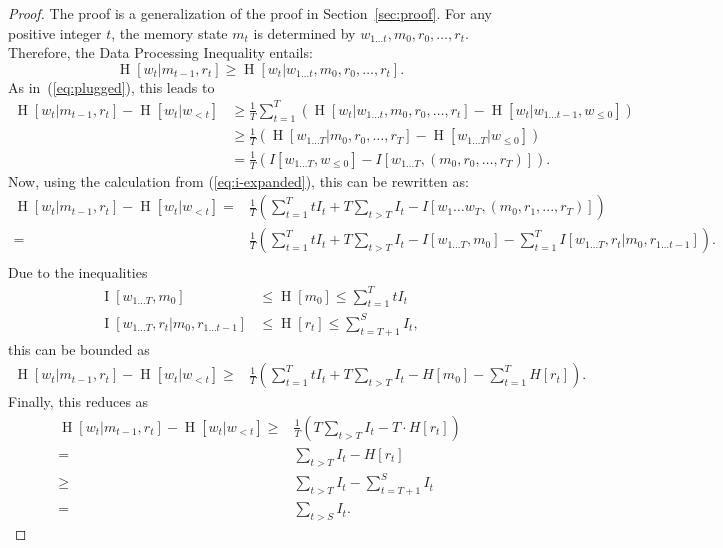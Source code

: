 \documentclass[11pt,letterpaper]{article}
\begin{document}
\begin{proof}
The proof is a generalization of the proof in Section~\ref{sec:proof}.
	For any positive integer $t$, the memory state $m_t$ is determined by $w_{1\dots t}, m_0, r_0, \dots, r_t$.
	Therefore, the Data Processing Inequality entails:
	\begin{equation}
		\operatorname{H}[w_t|m_{t-1}, r_t] \geq \operatorname{H}[w_t|w_{1\dots t}, m_0, r_0, \dots, r_t].
	\end{equation}
	As in~(\ref{eq:plugged}), this leads to
\begin{align}
\operatorname{H}[w_t | m_{t-1}, r_t] - \operatorname{H}[w_t | w_{<t}]& \geq \frac{1}{T} \sum_{t=1}^T ( \operatorname{H}[w_t|w_{1\dots t}, m_0, r_0, \dots, r_t] - \operatorname{H}[w_t | w_{1\dots t-1}, w_{\leq 0}]  )    \\
& \geq \frac{1}{T} \left(\operatorname{H}[w_{1\dots T} | m_0, r_0, \dots, r_T] - \operatorname{H}[w_{1\dots T} | w_{\leq 0}]\right)  \\
	& = \frac{1}{T} \left(I[w_{1\dots T}, w_{\leq 0}] - I[w_{1\dots T}, (m_0, r_0, \dots, r_T)]\right).
\end{align}
	Now, using the calculation from (\ref{eq:i-expanded}), this can be rewritten as:
	\begin{align*}
\operatorname{H}[w_t | m_{t-1}, r_t] - \operatorname{H}[w_t | w_{<t}]= & \frac{1}{T}\left(\sum_{t=1}^T t I_t + T \sum_{t>T} I_t - I[w_1\dots w_T, (m_0, r_1, ..., r_T)]\right) \\
		= & \frac{1}{T}\left(\sum_{t=1}^T t I_t + T \sum_{t>T} I_t - I[w_{1\dots T}, m_0] - \sum_{t=1}^T I[w_{1\dots T}, r_t|m_0, r_{1\dots t-1}]\right). \\
	\end{align*}
	Due to the inequalities
	\begin{align}
	    \operatorname{I}[w_{1\dots T}, m_0] &\leq \operatorname{H}[m_0] \leq \sum_{t=1}^T t I_t\\
	    \operatorname{I}[w_{1\dots T}, r_t|m_0, r_{1\dots t-1}] &\leq \operatorname{H}[r_t] \leq \sum_{t=T+1}^S I_t,
	\end{align}
	this can be bounded as
	\begin{align}
\operatorname{H}[w_t | m_{t-1}, r_t] - \operatorname{H}[w_t | w_{<t}]		\geq & \frac{1}{T}\left(\sum_{t=1}^T t I_t  + T \sum_{t>T} I_t-H[m_0] - \sum_{t=1}^T H[r_t]\right).
	\end{align}
	Finally, this reduces as
	\begin{align}
	\operatorname{H}[w_t | m_{t-1}, r_t] - \operatorname{H}[w_t | w_{<t}]		\geq &  \frac{1}{T}(T \sum_{t>T} I_t - T\cdot H[r_t]) \\
	= & \sum_{t>T} I_t- H[r_t]  \\
		\geq & \sum_{t>T} I_t - \sum_{t=T+1}^S I_t \\
		= &  \sum_{t>S} I_t.
\end{align}
\end{proof}
\end{document}
